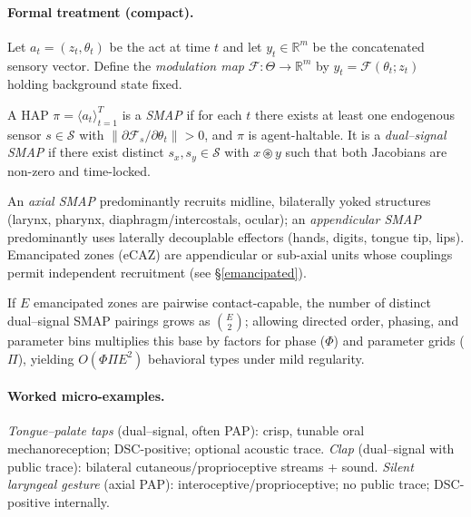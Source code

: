 \paragraph{Formal treatment (compact).}
Let $a_t=(z_t,\theta_t)$ be the act at time $t$ and let $y_t\in\mathbb{R}^m$ be the concatenated sensory vector. Define the \emph{modulation map} $\mathcal{F}: \Theta \to \mathbb{R}^m$ by $y_t=\mathcal{F}(\theta_t;z_t)$ holding background state fixed.

\begin{definition}
A HAP $\pi=\langle a_t\rangle_{t=1}^{T}$ is a \emph{SMAP} if for each $t$ there exists at least one endogenous sensor $s\in\mathcal{S}$ with $\|\partial \mathcal{F}_s/\partial\theta_t\|>0$, and $\pi$ is agent-haltable. It is a \emph{dual–signal SMAP} if there exist distinct $s_x,s_y\in\mathcal{S}$ with $x \circledast y$ such that both Jacobians are non-zero and time-locked.
\end{definition}

\begin{definition}
An \emph{axial SMAP} predominantly recruits midline, bilaterally yoked structures (larynx, pharynx, diaphragm/intercostals, ocular); an \emph{appendicular SMAP} predominantly uses laterally decouplable effectors (hands, digits, tongue tip, lips). Emancipated zones (eCAZ) are appendicular or sub-axial units whose couplings permit independent recruitment (see \S\ref{emancipated}).
\end{definition}

\begin{proposition}
If $E$ emancipated zones are pairwise contact-capable, the number of distinct dual–signal SMAP pairings grows as $\binom{E}{2}$; allowing directed order, phasing, and parameter bins multiplies this base by factors for phase ($\Phi$) and parameter grids ($\Pi$), yielding $O(\Phi \Pi E^2)$ behavioral types under mild regularity.
\end{proposition}

\paragraph{Worked micro-examples.}
\emph{Tongue–palate taps} (dual–signal, often PAP): crisp, tunable oral mechanoreception; DSC-positive; optional acoustic trace. 
\emph{Clap} (dual–signal with public trace): bilateral cutaneous/proprioceptive streams + sound.
\emph{Silent laryngeal gesture} (axial PAP): interoceptive/proprioceptive; no public trace; DSC-positive internally.

